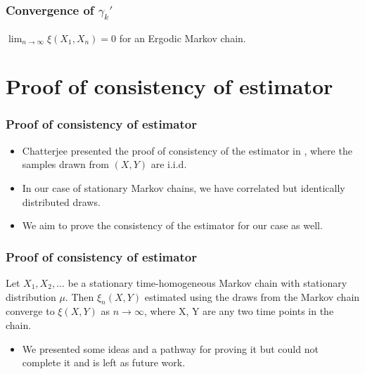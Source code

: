 \documentclass [xcolor=svgnames, t] {beamer}
\begin{document}
\begin{frame}
    \frametitle{Convergence of $\gamma_k'$}
    \vspace{6em}
    \begin{theorem}
        $\lim_{n \rightarrow \infty} \xi(X_1, X_{n}) = 0$ for an Ergodic Markov chain.
    \end{theorem}
\end{frame}


\section{Proof of consistency of estimator}
\begin{frame}
    \frametitle{Proof of consistency of estimator}
    \begin{itemize}
        \item Chatterjee presented the proof of consistency of the estimator in \cite{chatterjee2020sourav}, where the samples drawn from $(X, Y)$ are i.i.d.
        \vspace{2em}
        \item In our case of stationary Markov chains, we have correlated but identically distributed draws.
        \vspace{2em}
        \item We aim to prove the consistency of the estimator for our case as well.
    \end{itemize}
\end{frame}

\begin{frame}
    \frametitle{Proof of consistency of estimator}
    \begin{theorem}
        Let $X_1, X_2, \dots$ be a stationary time-homogeneous Markov chain with stationary distribution $\mu$.
		Then $\xi_n(X, Y)$ estimated using the draws from the Markov chain converge to $\xi(X, Y)$ as $n \rightarrow \infty$, where X, Y are any two time points in the chain.
    \end{theorem}
    \vspace{2em}
    \begin{itemize}
        \item We presented some ideas and a pathway for proving it but could not complete it and is left as future work.
    \end{itemize}



\end{frame}
\end{document}
